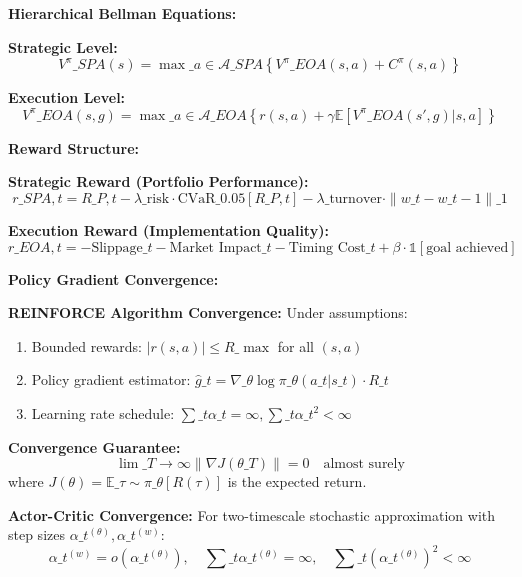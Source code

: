 \documentclass[11pt,a4paper]{article}
\begin{document}
\textbf{Hierarchical Bellman Equations:}

\textbf{Strategic Level:}
\begin{equation}
V^{\pi}\_{SPA}(s) = \max\_{a \in \mathcal{A}\_{SPA}} \left\{V^{\pi}\_{EOA}(s, a) + C^{\pi}(s, a)\right\}
\end{equation}

\textbf{Execution Level:}
\begin{equation}
V^{\pi}\_{EOA}(s, g) = \max\_{a \in \mathcal{A}\_{EOA}} \left\{r(s, a) + \gamma \mathbb{E}[V^{\pi}\_{EOA}(s', g) | s, a]\right\}
\end{equation}

\textbf{Reward Structure:}

\textbf{Strategic Reward (Portfolio Performance):}
\begin{equation}
r\_{SPA,t} = R\_{P,t} - \lambda\_{\text{risk}} \cdot \text{CVaR}\_{0.05}[R\_{P,t}] - \lambda\_{\text{turnover}} \cdot \|w\_t - w\_{t-1}\|\_1
\end{equation}

\textbf{Execution Reward (Implementation Quality):}
\begin{equation}
r\_{EOA,t} = -\text{Slippage}\_t - \text{Market Impact}\_t - \text{Timing Cost}\_t + \beta \cdot \mathbb{1}[\text{goal achieved}]
\end{equation}

\textbf{Policy Gradient Convergence:}

\textbf{REINFORCE Algorithm Convergence:}
Under assumptions:
\begin{enumerate}
\item Bounded rewards: $|r(s,a)| \leq R\_{\max}$ for all $(s,a)$
\item Policy gradient estimator: $\hat{g}\_t = \nabla\_{\theta} \log \pi\_{\theta}(a\_t|s\_t) \cdot R\_t$
\item Learning rate schedule: $\sum\_{t} \alpha\_t = \infty, \sum\_{t} \alpha\_t^2 < \infty$

\end{enumerate}
\textbf{Convergence Guarantee:}
\begin{equation}
\lim\_{T \to \infty} \|\nabla J(\theta\_T)\| = 0 \quad \text{almost surely}
\end{equation}
where $J(\theta) = \mathbb{E}\_{\tau \sim \pi\_{\theta}}[R(\tau)]$ is the expected return.

\textbf{Actor-Critic Convergence:}
For two-timescale stochastic approximation with step sizes $\alpha\_t^{(\theta)}, \alpha\_t^{(w)}$:
\begin{equation}
\alpha\_t^{(w)} = o(\alpha\_t^{(\theta)}), \quad \sum\_t \alpha\_t^{(\theta)} = \infty, \quad \sum\_t (\alpha\_t^{(\theta)})^2 < \infty
\end{equation}
\end{document}

